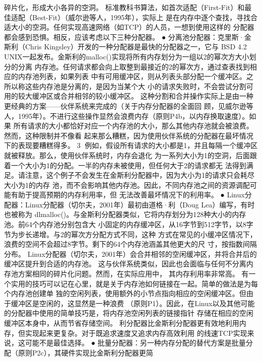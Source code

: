碎片化，形成大小各异的空洞。
标准教科书算法，如首次适配（First-Fit）和最佳适配（Best-Fit）（威尔逊等人，1995年），实际上
是在内存中逐个查找，寻找合适大小的空洞。任何实现高速网络（如TCP）的人员，一想到使用这样的
分配器都会感到恐惧。相反，应该考虑以下三种分配器。
  ● 分离池分配器：克里斯·金斯利（Chris Kingsley）开发的一种分配器是最快的分配器之一，它与
    BSD 4.2 UNIX一起发布。金斯利的malloc()实现将所有内存划分为一组以2的幂次方大小划分的分离
    内存池。任何请求都会向上取整到最接近的2的幂次方，通过查表找到相应的内存池列表，如果列表
    中有可用缓冲区，则从列表头部分配一个缓冲区。之所以称这些内存池是分离的，是因为当某个大
    小的请求失败时，不会尝试分割可用的较大缓冲区或合并相邻的较小缓冲区。
这种分割和合并操作实际上是由一种更经典的方案——伙伴系统来完成的（关于内存分配器的全面回
顾，见威尔逊等人，1995年）。不进行这些操作显然会浪费内存（原则P4b，以内存换取速度）。如果
所有请求的大小都恰好对应一个内存池的大小，那么其他内存池就会被浪费。然而，这种限制并不像看
起来那么糟糕，因为使用伙伴系统的分配器在最坏情况下的表现要糟糕得多。
                                                         3
例如，假设所有请求的大小都是1，并且每隔一个缓冲区就被释放。那么，使用伙伴系统时，内存会退化
为一系列大小为1的空洞，后面跟着一个大小为1的分配。一半的内存未被使用，但任何大于2的请求都无
法得到满足。请注意，这个例子不会发生在金斯利分配器中，因为大小为1的请求只会耗尽大小为1的内存
池，而不会影响其他内存池。因此，不同内存池之间的资源调配可能有助于提高预期的内存利用率，但
无法改善最坏情况下的利用率。
  ● Linux分配器：Linux分配器（切尔夫，2001年）最初由道格·利（Doug Lea）编写，有时也被称为
    dlmalloc()。与金斯利分配器类似，它将内存划分为128种大小的内存池。前64个内存池分别包含大
    小固定的内存缓冲区，从16字节到512字节，以8字节为步长递增。与2的幂次方分配方式不同，这种
    方式在常见的小缓冲区情况下，浪费的空间不会超过8字节。剩下的64个内存池涵盖其他更大的尺
    寸，按指数间隔分布。
Linux分配器（切尔夫，2001年）会合并相邻的空闲缓冲区，并将合并后的缓冲区提升到合适的内存池。
这与伙伴系统类似，因此也会面临与任何不分离内存池方案相同的碎片化问题。然而，在实际应用中，
其内存利用率非常高。
有一个实用的技巧可以记在心里，就是关于内存池如何链接在一起。简单的做法是为每个内存池创建单
独的空闲列表，使用额外的小节点指向相应的空闲缓冲区。但由于缓冲区是空闲的，这显然是一种浪费
（原则P1）。因此，在Linux以及其他可能的分配器中使用的简单技巧是，将内存池空闲列表的链接指针
存储在相应的空闲缓冲区本身中，从而节省存储空间。
利分配器比金斯利分配器更有效地利用内存，但实现起来更复杂。对于既追求速度又追求内存高效利用
的线速TCP实现来说，这可能不是最佳选择。
  ● 批量分配器：另一种内存分配的替代方案是批量分配（原则P2c），其硬件实现比金斯利分配器更简
